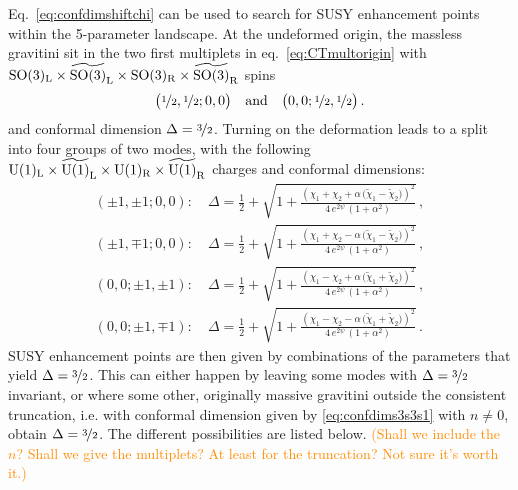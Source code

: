 \documentclass[a4paper, 11pt]{article}
\numberwithin{equation}{section}
\newcommand{\ts}[1]{\widetilde{#1}}
\newcommand{\+}{\oplus}
\newcommand{\CE}[1]{\textcolor{darkorange}{#1}}
\begin{document}
Eq.~\eqref{eq:confdimshiftchi} can be used to search for SUSY enhancement points within the 5-parameter landscape. At the undeformed origin, the massless gravitini sit in the two first multiplets in eq.~\eqref{eq:CTmultorigin} with ${\rm SO}(3)_{\rm L}\times\ts{{\rm SO}(3)}_{\rm L}\times{\rm SO}(3)_{\rm R}\times\ts{{\rm SO}(3)}_{\rm R}$ spins
\begin{equation}
	\big(\nicefrac{1}{2},\nicefrac{1}{2};0,0\big) \quad {\rm and} \quad \big(0,0;\nicefrac{1}{2},\nicefrac{1}{2}\big)\,.
\end{equation}
and conformal dimension $\Delta=\nicefrac{3}{2}$. Turning on the deformation leads to a split into four groups of two modes, with the following ${\rm U}(1)_{\rm L}\times\ts{{\rm U}(1)}_{\rm L}\times{\rm U}(1)_{\rm R}\times\ts{{\rm U}(1)}_{\rm R}$ charges and conformal dimensions:
\begin{equation}
	\begin{split}
		\left(\pm1,\pm1;0,0\right):\quad \Delta=\frac{1}{2}+\sqrt{1 + \frac{\left(%
		\chi_{1}+\chi_{2}+\alpha\,\big(\ts{\chi}_{1}-\ts{\chi}_{2}\big)\right)^{2}}{4\, e^{2\psi}\, (1+\alpha^{2})}}\,, \\
		\left(\pm1,\mp1;0,0\right):\quad \Delta=\frac{1}{2}+\sqrt{1 + \frac{\left(%
		\chi_{1}+\chi_{2}-\alpha\,\big(\ts{\chi}_{1}-\ts{\chi}_{2}\big)\right)^{2}}{4\, e^{2\psi}\, (1+\alpha^{2})}}\,, \\
		\left(0,0;\pm1,\pm1\right):\quad \Delta=\frac{1}{2}+\sqrt{1 + \frac{\left(%
		\chi_{1}-\chi_{2}+\alpha\,\big(\ts{\chi}_{1}+\ts{\chi}_{2}\big)\right)^{2}}{4\, e^{2\psi}\, (1+\alpha^{2})}}\,, \\
		\left(0,0;\pm1,\mp1\right):\quad \Delta=\frac{1}{2}+\sqrt{1 + \frac{\left(%
		\chi_{1}-\chi_{2} - \alpha\,\big(\ts{\chi}_{1}+\ts{\chi}_{2}\big)\right)^{2}}{4\, e^{2\psi}\, (1+\alpha^{2})}}\,.
	\end{split}
\end{equation}
SUSY enhancement points are then given by combinations of the parameters that yield $\Delta = \nicefrac32$. This can either happen by leaving some modes with $\Delta=\nicefrac{3}{2}$ invariant, or where some other, originally massive gravitini outside the consistent truncation, i.e. with conformal dimension given by \eqref{eq:confdims3s3s1} with $n \neq 0$, obtain $\Delta = \nicefrac32$. The different possibilities are listed below. \CE{(Shall we include the $n$? Shall we give the multiplets? At least for the truncation? Not sure it's worth it.)}
\end{document}
